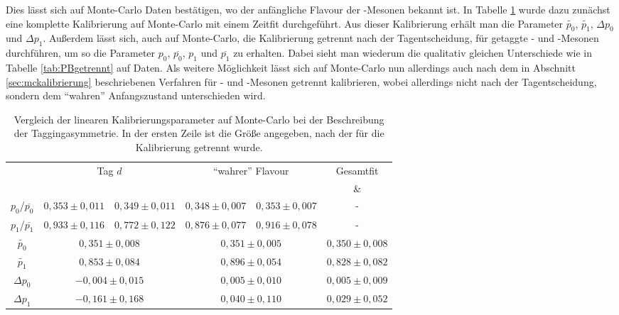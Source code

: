 Dies lässt sich auf Monte-Carlo Daten bestätigen, wo der anfängliche Flavour der \B-Mesonen bekannt ist. In Tabelle \ref{tab:mcgetrennt} wurde dazu zunächst eine komplette Kalibrierung auf Monte-Carlo mit einem Zeitfit durchgeführt. Aus dieser Kalibrierung erhält man die Parameter $\widetilde{p_0}$, $\widetilde{p_1}$, $\Delta p_0$ und $\Delta p_1$. Außerdem lässt sich, auch auf Monte-Carlo, die Kalibrierung getrennt nach der Tagentscheidung, für getaggte \Bz- und \Bzb-Mesonen durchführen, um so die Parameter $p_0$, $\overline{p_0}$, $p_1$ und $\overline{p_1}$ zu erhalten. Dabei sieht man wiederum die qualitativ gleichen Unterschiede wie in Tabelle \ref{tab:PBgetrennt} auf Daten. Als weitere Möglichkeit lässt sich auf Monte-Carlo nun allerdings auch nach dem in Abschnitt \ref{sec:mckalibrierung} beschriebenen Verfahren für \Bz- und \Bzb-Mesonen getrennt kalibrieren, wobei allerdings nicht nach der Tagentscheidung, sondern dem \enquote{wahren} Anfangszustand unterschieden wird.
\begin{table}[htbp]
	\centering
	\small
	\caption{Vergleich der linearen Kalibrierungsparameter auf Monte-Carlo bei der Beschreibung der Taggingasymmetrie. In der ersten Zeile ist die Größe angegeben, nach der für die Kalibrierung getrennt wurde.}
	\label{tab:mcgetrennt} 
	\begin{tabular}{c|ccccc}
	\toprule
	 & \multicolumn{2}{c}{Tag $d$} & \multicolumn{2}{c}{\enquote{wahrer} Flavour} & Gesamtfit \\
	 & \Bzb & \Bz & \Bzb & \Bz & \Bzb \& \Bz \\ 
	 \midrule
      $p_0$/$\overline{p_0}$  & $0{,}353\pm0{,}011$ & $0{,}349\pm0{,}011$ & $0{,}348\pm0{,}007$ & $0{,}353\pm0{,}007$ & - \\  
      $p_1$/$\overline{p_1}$ & $0{,}933\pm0{,}116$ & $0{,}772\pm0{,}122$ & $0{,}876\pm0{,}077$ & $0{,}916\pm0{,}078$ & - \\
      $\widetilde{p_0}$ & \multicolumn{2}{c}{$0{,}351\pm0{,}008$} & \multicolumn{2}{c}{$0{,}351\pm0{,}005$} &  $0{,}350\pm0{,}008$ \\
      $\widetilde{p_1}$ &  \multicolumn{2}{c}{$0{,}853\pm0{,}084$} & \multicolumn{2}{c}{$0{,}896\pm0{,}054$} & $0{,}828\pm0{,}082$ \\
      $\Delta p_0$ & \multicolumn{2}{c}{$-0{,}004\pm0{,}015$} & \multicolumn{2}{c}{$0{,}005\pm0{,}010$} & $0{,}005\pm0{,}009$ \\
      $\Delta p_1$ & \multicolumn{2}{c}{$-0{,}161\pm0{,}168$} & \multicolumn{2}{c}{$0{,}040\pm0{,}110$} & $0{,}029\pm0{,}052$ \\ 
      \bottomrule
	\end{tabular}
\end{table}
